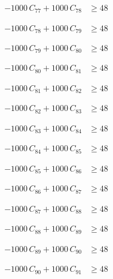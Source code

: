 \documentclass[a4paper,11pt]{article}
\begin{document}
\begin{align}
-1000\,C_{77} + 1000\,C_{78} &\geq 48 \nonumber
\end{align}

\begin{align}
-1000\,C_{78} + 1000\,C_{79} &\geq 48 \nonumber
\end{align}

\begin{align}
-1000\,C_{79} + 1000\,C_{80} &\geq 48 \nonumber
\end{align}

\begin{align}
-1000\,C_{80} + 1000\,C_{81} &\geq 48 \nonumber
\end{align}

\begin{align}
-1000\,C_{81} + 1000\,C_{82} &\geq 48 \nonumber
\end{align}

\begin{align}
-1000\,C_{82} + 1000\,C_{83} &\geq 48 \nonumber
\end{align}

\begin{align}
-1000\,C_{83} + 1000\,C_{84} &\geq 48 \nonumber
\end{align}

\begin{align}
-1000\,C_{84} + 1000\,C_{85} &\geq 48 \nonumber
\end{align}

\begin{align}
-1000\,C_{85} + 1000\,C_{86} &\geq 48 \nonumber
\end{align}

\begin{align}
-1000\,C_{86} + 1000\,C_{87} &\geq 48 \nonumber
\end{align}

\begin{align}
-1000\,C_{87} + 1000\,C_{88} &\geq 48 \nonumber
\end{align}

\begin{align}
-1000\,C_{88} + 1000\,C_{89} &\geq 48 \nonumber
\end{align}

\begin{align}
-1000\,C_{89} + 1000\,C_{90} &\geq 48 \nonumber
\end{align}

\begin{align}
-1000\,C_{90} + 1000\,C_{91} &\geq 48 \nonumber
\end{align}
\end{document}
